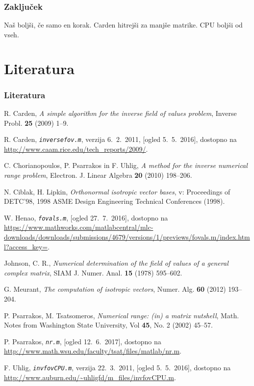 \documentclass{beamer}
\begin{document}
\begin{frame}
\frametitle{Zaključek}
Naš boljši, če samo en korak. Carden hitrejši za manjše matrike. CPU boljši od vseh.
\end{frame}

\section{Literatura}
\begin{frame}[allowframebreaks]
\frametitle{Literatura}
\begin{thebibliography}{99}



R. Carden, \emph{A simple algorithm for the inverse field of values problem}, Inverse Probl. {\bf 25} (2009) 1--9.

R. Carden, \emph{\texttt{inversefov.m}}, verzija 6.~2.~2011, [ogled 5.~5.~2016], dostopno na \url{http://www.caam.rice.edu/tech_reports/2009/}.

C. Chorianopoulos, P. Psarrakos in F. Uhlig, \emph{A method for the inverse numerical range problem}, Electron. J. Linear Algebra {\bf 20} (2010) 198--206.

N. Ciblak, H. Lipkin, \emph{Orthonormal isotropic vector bases}, v: Proceedings of DETC'98, 1998 ASME Design Engineering Technical Conferences (1998).

W. Henao, \emph{\texttt{fovals.m}}, [ogled 27.~7.~2016], dostopno na \url{https://www.mathworks.com/matlabcentral/mlc-downloads/downloads/submissions/4679/versions/1/previews/fovals.m/index.html?access_key=}.

Johnson, C. R., \emph{Numerical determination of the field of values of a general complex matrix}, SIAM J. Numer. Anal. {\bf 15} (1978) 595--602.

G. Meurant, \emph{The computation of isotropic vectors}, Numer. Alg. {\bf 60} (2012) 193--204.

P. Psarrakos, M. Tsatsomeros, \emph{Numerical range: (in) a matrix nutshell}, Math. Notes from Washington State University,  Vol {\bf 45}, No. 2 (2002) 45--57.

P. Psarrakos, \emph{\texttt{nr.m}}, [ogled 12.~6.~2017], dostopno na \url{http://www.math.wsu.edu/faculty/tsat/files/matlab/nr.m}.

F. Uhlig, \emph{\texttt{invfovCPU.m}}, verzija 22.~3.~2011, [ogled 5.~5.~2016], dostopno na \url{http://www.auburn.edu/~uhligfd/m_files/invfovCPU.m}.

\end{thebibliography}
\end{frame}
\end{document}
